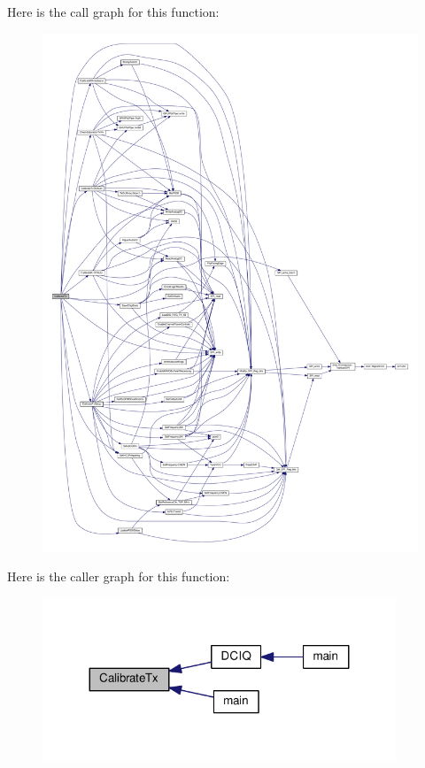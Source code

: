 Here is the call graph for this function\+:
\nopagebreak
\begin{figure}[H]
\begin{center}
\leavevmode
\includegraphics[width=350pt]{d3/dec/lms7002m__calibrations_8c_a208452a11189052c6dcd2fe639e4fcae_cgraph}
\end{center}
\end{figure}




Here is the caller graph for this function\+:
\nopagebreak
\begin{figure}[H]
\begin{center}
\leavevmode
\includegraphics[width=299pt]{d3/dec/lms7002m__calibrations_8c_a208452a11189052c6dcd2fe639e4fcae_icgraph}
\end{center}
\end{figure}


